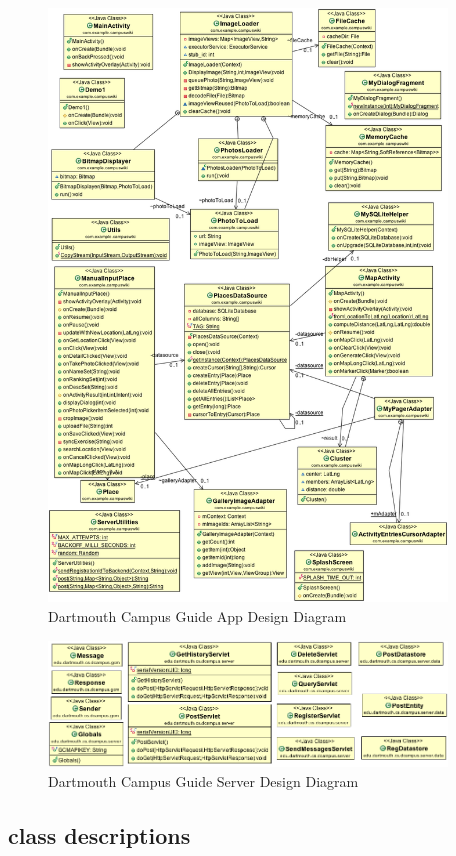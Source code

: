 \documentclass{article}
\begin{document}
\begin{figure}[h!]   
\centering
\includegraphics[width = 300pt]{Figures/CampusWiki_2.png}
\caption{Dartmouth Campus Guide App Design Diagram}
\label{F:campuswiki}
\end{figure}



\begin{figure}[h!]   
\centering
\includegraphics[width = 300pt]{Figures/server_diagram.png}
\caption{Dartmouth Campus Guide Server Design Diagram}
\label{F:campuswiki_server}
\end{figure}

\subsection {class descriptions}
\end{document}
